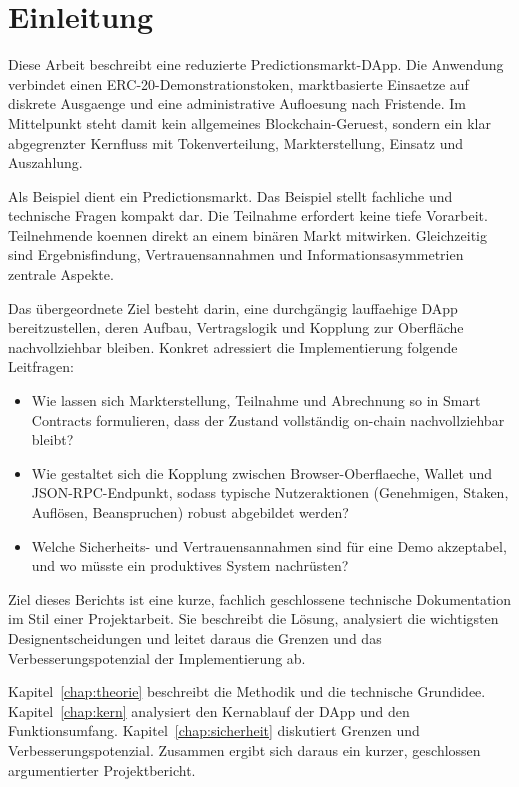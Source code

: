 \section{Einleitung}
Diese Arbeit beschreibt eine reduzierte Predictionsmarkt-DApp. Die Anwendung
verbindet einen ERC-20-Demonstrationstoken, marktbasierte Einsaetze auf diskrete
Ausgaenge und eine administrative Aufloesung nach Fristende. Im Mittelpunkt steht
damit kein allgemeines Blockchain-Geruest, sondern ein klar abgegrenzter
Kernfluss mit Tokenverteilung, Markterstellung, Einsatz und Auszahlung.

Als Beispiel dient ein Predictionsmarkt. Das Beispiel stellt fachliche und
technische Fragen kompakt dar. Die Teilnahme erfordert keine tiefe Vorarbeit.
Teilnehmende koennen direkt an einem binären Markt mitwirken. Gleichzeitig sind
Ergebnisfindung, Vertrauensannahmen und Informationsasymmetrien zentrale
Aspekte.

Das übergeordnete Ziel besteht darin, eine durchgängig lauffaehige DApp
bereitzustellen, deren Aufbau, Vertragslogik und Kopplung zur Oberfläche
nachvollziehbar bleiben. Konkret adressiert die Implementierung folgende Leitfragen:
\begin{itemize}
  \item Wie lassen sich Markterstellung, Teilnahme und Abrechnung so in Smart
    Contracts formulieren, dass der Zustand vollständig on-chain nachvollziehbar
    bleibt?
  \item Wie gestaltet sich die Kopplung zwischen Browser-Oberflaeche, Wallet und
    JSON-RPC-Endpunkt, sodass typische Nutzeraktionen (Genehmigen, Staken,
    Auflösen, Beanspruchen) robust abgebildet werden?
  \item Welche Sicherheits- und Vertrauensannahmen sind für eine Demo akzeptabel,
    und wo müsste ein produktives System nachrüsten?
\end{itemize}

Ziel dieses Berichts ist eine kurze, fachlich geschlossene technische
Dokumentation im Stil einer Projektarbeit. Sie beschreibt die Lösung, analysiert
die wichtigsten Designentscheidungen und leitet daraus die Grenzen und das
Verbesserungspotenzial der Implementierung ab.

Kapitel~\ref{chap:theorie} beschreibt die Methodik und die technische Grundidee.
Kapitel~\ref{chap:kern} analysiert den Kernablauf der DApp und den
Funktionsumfang. Kapitel~\ref{chap:sicherheit} diskutiert Grenzen und
Verbesserungspotenzial. Zusammen ergibt sich daraus ein kurzer, geschlossen
argumentierter Projektbericht.

